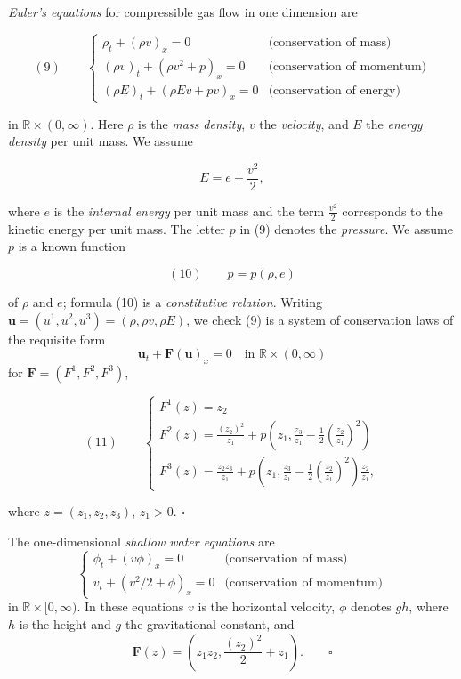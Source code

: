 \begin{example}
\label{ex:euler-equations-1d-system}
\textit{Euler's equations} for compressible gas flow in one dimension are

$$(9) \qquad \begin{cases} \rho_t + (\rho v)_x = 0 & \text{(conservation of mass)} \\ (\rho v)_t + (\rho v^2+p)_x = 0 & \text{(conservation of momentum)} \\ (\rho E)_t + (\rho E v + pv)_x = 0 & \text{(conservation of energy)} \end{cases}$$

in $\mathbb{R}\times(0,\infty)$. Here $\rho$ is the \textit{mass density}, $v$ the \textit{velocity}, and $E$ the \textit{energy density} per unit mass. We assume

$$E = e + \frac{v^2}{2},$$

where $e$ is the \textit{internal energy} per unit mass and the term $\frac{v^2}{2}$ corresponds to the kinetic energy per unit mass. The letter $p$ in (9) denotes the \textit{pressure}. We assume $p$ is a known function

$$(10) \qquad p = p(\rho,e)$$

of $\rho$ and $e$; formula (10) is a \textit{constitutive relation}. Writing $\mathbf{u}=(u^1,u^2,u^3)=(\rho,\rho v,\rho E)$, we check (9) is a system of conservation laws of the requisite form
$$\mathbf{u}_t + \mathbf{F}(\mathbf{u})_x = 0 \quad \text{in } \mathbb{R}\times(0,\infty)$$
for $\mathbf{F}=(F^1,F^2,F^3)$,

$$(11) \qquad \begin{cases} F^1(z) = z_2 \\ F^2(z) = \frac{(z_2)^2}{z_1} + p\left(z_1, \frac{z_3}{z_1} - \frac{1}{2}\left(\frac{z_2}{z_1}\right)^2\right) \\ F^3(z) = \frac{z_2 z_3}{z_1} + p\left(z_1, \frac{z_3}{z_1} - \frac{1}{2}\left(\frac{z_2}{z_1}\right)^2\right)\frac{z_2}{z_1}, \end{cases}$$

where $z=(z_1,z_2,z_3)$, $z_1 > 0$. $\square$
\end{example}

\begin{example}
\label{ex:shallow-water-equations}
The one-dimensional \textit{shallow water equations} are
$$\begin{cases} \phi_t + (v\phi)_x = 0 & \text{(conservation of mass)} \\ v_t + (v^2/2+\phi)_x = 0 & \text{(conservation of momentum)} \end{cases}$$
in $\mathbb{R}\times[0,\infty)$. In these equations $v$ is the horizontal velocity, $\phi$ denotes $gh$, where $h$ is the height and $g$ the gravitational constant, and
$$\mathbf{F}(z) = \left(z_1z_2, \frac{(z_2)^2}{2} + z_1\right). \qquad \square$$
\end{example}

